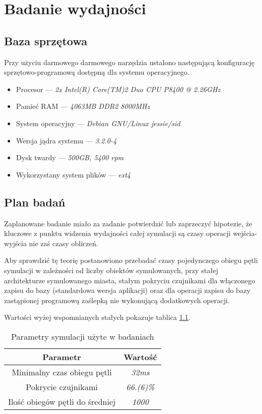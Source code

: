 \chapter{Badanie wydajności}
\section{Baza sprzętowa}
\par{
Przy użyciu darmowego darmowego narzędzia ustalono następującą konfigurację sprzętowo-programową dostępną dla systemu operacyjnego.
\begin{itemize}
\item Procesor --- \textit{2x Intel(R) Core(TM)2 Duo CPU P8400 @ 2.26GHz}
\item Pamieć RAM --- \textit{4063MB DDR2 8000MHz}
\item System operacyjny --- \textit{Debian GNU/Linux jessie/sid}
\item Wersja jądra systemu --- \textit{3.2.0-4}
\item Dysk twardy --- \textit{500GB, 5400 rpm}
\item Wykorzystany system plików --- \textit{ext4}
\end{itemize}
}

\section{Plan badań}
\par{
Zaplanowane badanie miało za zadanie potwierdzić lub zaprzeczyć hipotezie, że kluczowe z punktu widzenia wydajności całej symulacji są czasy operacji wejścia-wyjścia nie zaś czasy obliczeń.
}
\par{
Aby sprawdzić tę teorię postanowiono przebadać czasy pojedynczego obiegu pętli symulacji w zależności od liczby obiektów symulowanych, przy stałej architekturze symulowanego miasta, stałym pokryciu czujnikami dla włączonego zapisu do bazy (standardowa wersja aplikacji) oraz dla operacji zapisu do bazy zastąpionej programową zaślepką nie wykonującą dodatkowych operacji.
}
\par{
Wartości wyżej wspomnianych stałych pokazuje tablica \ref{cost_table}.
}
\begin{table}[t]
\caption{Parametry symulacji użyte w badaniach}
\label{cost_table}
\begin{center}
\begin{tabular}{|c|c|}
  \hline 
  \textbf{Parametr} & \textbf{Wartość} \\
  \hline
  Minimalny czas obiegu pętli & \textit{32ms} \\
  Pokrycie czujnikami & \textit{66.(6)\%} \\
  Ilość obiegów pętli do średniej & \textit{1000} \\
  \hline  
\end{tabular}
\end{center}
\end{table}

